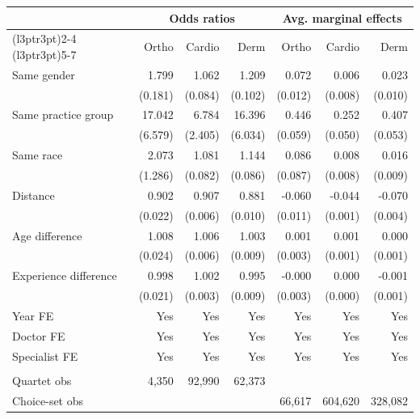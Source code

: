\begin{tabular}{lrrrrrr}
\toprule
\multicolumn{1}{c}{ } & \multicolumn{3}{c}{Odds ratios} & \multicolumn{3}{c}{Avg. marginal effects} \\
\cmidrule(l{3pt}r{3pt}){2-4} \cmidrule(l{3pt}r{3pt}){5-7}
 & Ortho & Cardio & Derm & Ortho & Cardio & Derm\\
\midrule
Same gender & 1.799 & 1.062 & 1.209 & 0.072 & 0.006 & 0.023\\
 & (0.181) & (0.084) & (0.102) & (0.012) & (0.008) & (0.010)\\
Same practice group & 17.042 & 6.784 & 16.396 & 0.446 & 0.252 & 0.407\\
 & (6.579) & (2.405) & (6.034) & (0.059) & (0.050) & (0.053)\\
Same race & 2.073 & 1.081 & 1.144 & 0.086 & 0.008 & 0.016\\
 & (1.286) & (0.082) & (0.086) & (0.087) & (0.008) & (0.009)\\
Distance & 0.902 & 0.907 & 0.881 & -0.060 & -0.044 & -0.070\\
 & (0.022) & (0.006) & (0.010) & (0.011) & (0.001) & (0.004)\\
Age difference & 1.008 & 1.006 & 1.003 & 0.001 & 0.001 & 0.000\\
 & (0.024) & (0.006) & (0.009) & (0.003) & (0.001) & (0.001)\\
Experience difference & 0.998 & 1.002 & 0.995 & -0.000 & 0.000 & -0.001\\
 & (0.021) & (0.003) & (0.009) & (0.003) & (0.000) & (0.001)\\
\midrule
Year FE & Yes & Yes & Yes & Yes & Yes & Yes\\
Doctor FE & Yes & Yes & Yes & Yes & Yes & Yes\\
Specialist FE & Yes & Yes & Yes & Yes & Yes & Yes\\
\midrule\\
Quartet obs & 4,350 & 92,990 & 62,373 &  &  & \\
Choice-set obs &  &  &  & 66,617 & 604,620 & 328,082\\
\bottomrule
\end{tabular}
